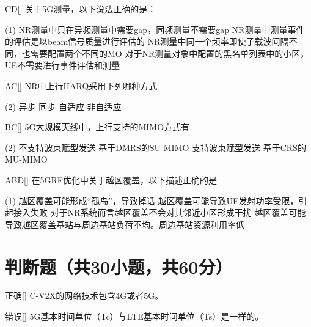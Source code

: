 \begin{choice}{\;CD\;}[]
    关于5G测量，以下说法正确的是：
    \begin{tasks}(1)
        \task NR测量中只在异频测量中需要gap，同频测量不需要gap
        \task NR测量中测量事件的评估是以beam信号质量进行评估的
        \task NR测量中同一个频率即使子载波间隔不同，也需要配置两个不同的MO
        \task 对于NR测量对象中配置的黑名单列表中的小区，UE不需要进行事件评估和测量
    \end{tasks}
\end{choice}


\begin{choice}{\;AC\;}[]
    NR中上行HARQ采用下列哪种方式
    \begin{tasks}(2)
        \task 异步
        \task 同步
        \task 自适应
        \task 非自适应
    \end{tasks}
\end{choice}


\begin{choice}{\;BC\;}[]
    5G大规模天线中，上行支持的MIMO方式有
    \begin{tasks}(2)
        \task 不支持波束赋型发送
        \task 基于DMRS的SU-MIMO
        \task 支持波束赋型发送
        \task 基于CRS的MU-MIMO
    \end{tasks}
\end{choice}


\begin{choice}{\;ABD\;}[]
    在5GRF优化中关于越区覆盖，以下描述正确的是
    \begin{tasks}(1)
        \task 越区覆盖可能形成“孤岛”，导致掉话
        \task 越区覆盖可能导致UE发射功率受限，引起接入失败
        \task 对于NR系统而言越区覆盖不会对其邻近小区形成干扰
        \task 越区覆盖可能导致越区覆盖基站与周边基站负荷不均。周边基站资源利用率低
    \end{tasks}
\end{choice}


\section{判断题（共30小题，共60分）}

\begin{choice}{\;正确\;}[]
    C-V2X的网络技术包含4G或者5G。
\end{choice}


\begin{choice}{\;错误\;}[]
    5G基本时间单位（Tc）与LTE基本时间单位（Ts）是一样的。
\end{choice}

